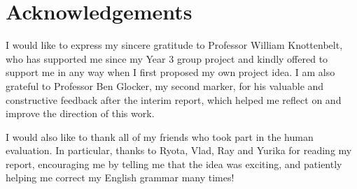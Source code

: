 \documentclass[12pt,twoside]{report}
\begin{document}
\cleardoublepage
\section*{Acknowledgements}

I would like to express my sincere gratitude to Professor William Knottenbelt, who has supported me since my Year 3 group project and kindly offered to support me in any way when I first proposed my own project idea. I am also grateful to Professor Ben Glocker, my second marker, for his valuable and constructive feedback after the interim report, which helped me reflect on and improve the direction of this work.\par

I would also like to thank all of my friends who took part in the human evaluation. In particular, thanks to Ryota, Vlad, Ray and Yurika for reading my report, encouraging me by telling me that the idea was exciting, and patiently helping me correct my English grammar many times!\par

\clearpage{\pagestyle{empty}\cleardoublepage}

\tableofcontents


\clearpage{\pagestyle{empty}\cleardoublepage}
\setcounter{page}{1}
\fancyhead[LO,RE]{}








\printbibliography



\end{document}
